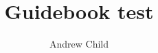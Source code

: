 \documentclass[10pt]{report}
\begin{document}
\title{Guidebook test}
\author{Andrew Child}
\date{}
\maketitle

\newcommand\chapterColor{MidnightBlue}

\twocolumn
\renewcommand\chapterColor{BrickRed}

\renewcommand\chapterColor{BurntOrange}

\renewcommand\chapterColor{PineGreen}

\renewcommand\chapterColor{RoyalPurple}

\end{document}
